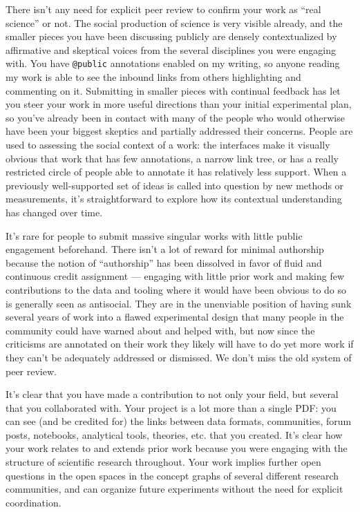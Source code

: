 \documentclass[10pt]{article}
\begin{document}
\begin{multicols}{2}
There isn't any need for explicit peer review to confirm your work as
``real science'' or not. The social production of science is very
visible already, and the smaller pieces you have been discussing
publicly are densely contextualized by affirmative and skeptical voices
from the several disciplines you were engaging with. You have
\texttt{@public} annotations enabled on my writing, so anyone reading my
work is able to see the inbound links from others highlighting and
commenting on it. Submitting in smaller pieces with continual feedback
has let you steer your work in more useful directions than your initial
experimental plan, so you've already been in contact with many of the
people who would otherwise have been your biggest skeptics and partially
addressed their concerns. People are used to assessing the social
context of a work: the interfaces make it visually obvious that work
that has few annotations, a narrow link tree, or has a really restricted
circle of people able to annotate it has relatively less support. When a
previously well-supported set of ideas is called into question by new
methods or measurements, it's straightforward to explore how its
contextual understanding has changed over time.

It's rare for people to submit massive singular works with little public
engagement beforehand. There isn't a lot of reward for minimal
authorship because the notion of ``authorship'' has been dissolved in
favor of fluid and continuous credit assignment --- engaging with little
prior work and making few contributions to the data and tooling where it
would have been obvious to do so is generally seen as antisocial. They
are in the unenviable position of having sunk several years of work into
a flawed experimental design that many people in the community could
have warned about and helped with, but now since the criticisms are
annotated on their work they likely will have to do yet more work if
they can't be adequately addressed or dismissed. We don't miss the old
system of peer review.

It's clear that you have made a contribution to not only your field, but
several that you collaborated with. Your project is a lot more than a
single PDF: you can see (and be credited for) the links between data
formats, communities, forum posts, notebooks, analytical tools,
theories, etc. that you created. It's clear how your work relates to and
extends prior work because you were engaging with the structure of
scientific research throughout. Your work implies further open questions
in the open spaces in the concept graphs of several different research
communities, and can organize future experiments without the need for
explicit coordination.


\end{multicols}
\end{document}
